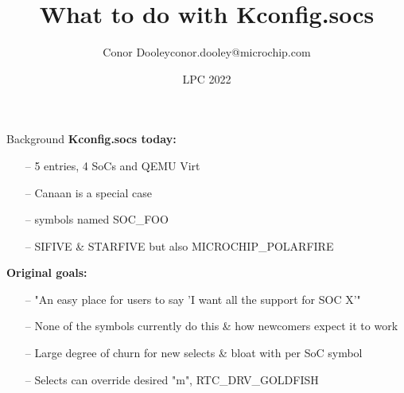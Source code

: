 \documentclass{beamer}
\title{What to do with Kconfig.socs}
\author{Conor Dooley\newline conor.dooley@microchip.com}
\subtitle{}
\date{LPC 2022}
\begin{document}


\begin{frame}
	\titlepage
\end{frame}

\begin{frame}{Background}
	\textbf{Kconfig.socs today:}
	\begin{itemize}
		\item[--]
		5 entries, 4 SoCs and QEMU Virt
		\item[--]
		Canaan is a special case
		\item[--]
		symbols named SOC\_FOO
		\item[--]
		SIFIVE \& STARFIVE but also MICROCHIP\_POLARFIRE 
	\end{itemize}
	\pause
	\textbf{Original goals:}
	\begin{itemize}
		\item[--]
		"An easy place for users to say 'I want all the support for SOC X'"\cite{libera}
		\item[--]
		None of the symbols currently do this \& how newcomers expect it to work
		\item[--]
		Large degree of churn for new selects \& bloat with per SoC symbol
		\item[--]
		Selects can override desired "m", RTC\_DRV\_GOLDFISH \cite{goldfish}
	\end{itemize}
\end{frame}
\end{document}
